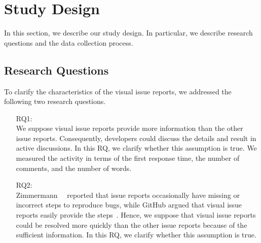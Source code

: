 \section{Study Design}
\label{sec:design}

In this section, we describe our study design. 
In particular, we describe research questions and 
the data collection process.

\subsection{Research Questions}
\label{sec:rqs}

To clarify the characteristics of 
the visual issue reports,
we addressed the following 
two research questions. 
\begin{itemize}
	\item[RQ1:] \textbf{\RQone{}}\\
	We suppose visual issue reports provide 
	more information than the other issue reports. 
	Consequently, developers could discuss the details and 
	result in active discussions. 
	In this RQ, we clarify whether this assumption is true. 
	We measured the activity in terms of 
	the first response time, 
	the number of comments, and 
	the number of words. 
	\item[RQ2:] \textbf{\RQtwo{}}\\
	Zimmermann~\et~\citep{zimmermann2010TSE} reported that
	issue reports occasionally have missing or incorrect steps 
	to reproduce bugs, 
	while GitHub argued that visual issue reports easily 
	provide the steps~\citep{github-video-blog}. 
	Hence, we suppose that visual issue reports could be 
	resolved more quickly than the other issue reports 
	because of the sufficient information. 
	In this RQ, we clarify whether this assumption is true. 
\end{itemize}

